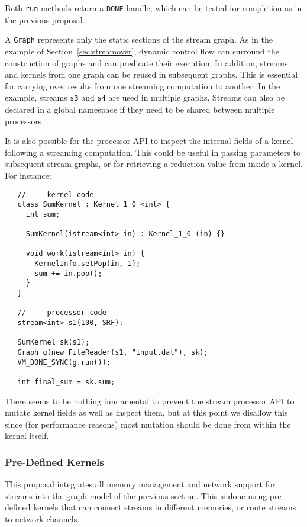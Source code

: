 Both {\tt run} methods return a {\tt DONE} handle, which can be tested
for completion as in the previous proposal.


A {\tt Graph} represents only the static sections of the stream graph.
As in the example of Section~\ref{sec:streamover}, dynamic control
flow can surround the construction of graphs and can predicate their
execution.  In addition, streams and kernels from one graph can be
reused in subsequent graphs.  This is essential for carrying over
results from one streaming computation to another.  In the example,
streams {\tt s3} and {\tt s4} are used in multiple graphs.  Streams
can also be declared in a global namespace if they need to be shared
between multiple processors.

It is also possible for the processor API to inspect the internal
fields of a kernel following a streaming computation.  This could be
useful in passing parameters to subsequent stream graphs, or for
retrieving a reduction value from inside a kernel.  For instance:
\begin{verbatim}
   // --- kernel code ---
   class SumKernel : Kernel_1_0 <int> {
     int sum;

     SumKernel(istream<int> in) : Kernel_1_0 (in) {}

     void work(istream<int> in) {
       KernelInfo.setPop(in, 1);
       sum += in.pop();
     }
   }

   // --- processor code ---
   stream<int> s1(100, SRF);

   SumKernel sk(s1);
   Graph g(new FileReader(s1, "input.dat"), sk);
   VM_DONE_SYNC(g.run());

   int final_sum = sk.sum;
\end{verbatim}

There seems to be nothing fundamental to prevent the stream processor
API to mutate kernel fields as well as inspect them, but at this point
we disallow this since (for performance reasons) most mutation should
be done from within the kernel itself.

\subsubsection{Pre-Defined Kernels}
\label{sec:predef}

This proposal integrates all memory management and network support for
streams into the graph model of the previous section.  This is done
using pre-defined kernels that can connect streams in different
memories, or route streams to network channels.

